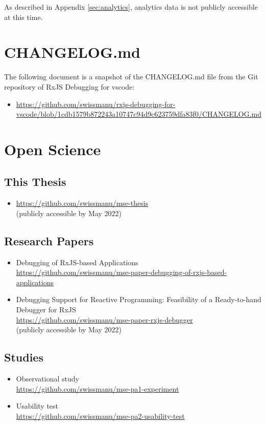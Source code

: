 As described in Appendix \ref{sec:analytics}, analytics data is not publicly accessible at this time.




\section{CHANGELOG.md}
\label{sec:changelog}
The following document is a snapshot of the CHANGELOG.md file from the Git repository of RxJS Debugging for vscode:

\begin{itemize}
  \item \url{https://github.com/swissmanu/rxjs-debugging-for-vscode/blob/1cdb1579b872243a10747c94d9c623759dfa83f0/CHANGELOG.md}
\end{itemize}




\section{Open Science}
\label{sec:open-science}

\subsection{This Thesis}
\begin{itemize}
  \item \url{https://github.com/swissmanu/mse-thesis} \\ (publicly accessible by May 2022)
\end{itemize}

\subsection{Research Papers}
\begin{itemize}
  \item Debugging of RxJS-based Applications \\ \url{https://github.com/swissmanu/mse-paper-debugging-of-rxjs-based-applications}
  \item Debugging Support for Reactive Programming: Feasibility of a Ready-to-hand Debugger for RxJS \\ \url{https://github.com/swissmanu/mse-paper-rxjs-debugger} \\ (publicly accessible by May 2022)
\end{itemize}

\subsection{Studies}
\begin{itemize}
  \item Observational study \\ \url{https://github.com/swissmanu/mse-pa1-experiment}
  \item Usability test \\ \url{https://github.com/swissmanu/mse-pa2-usability-test}
\end{itemize}
